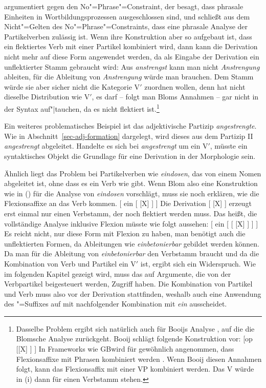 \citet[]{Blom2005a} argumentiert gegen den No"=Phrase"=Constraint, der besagt,
dass phrasale Einheiten in Wortbildungsprozessen ausgeschlossen sind, und schließt aus
dem Nicht"=Gelten des No"=Phrase"=Constraints, dass eine
phrasale Analyse der Partikelverben zulässig ist. Wenn ihre Konstruktion aber so aufgebaut
ist, dass ein flektiertes Verb mit einer Partikel kombiniert wird, dann kann die Derivation
nicht mehr auf diese Form angewendet werden, da als Eingabe der Derivation ein unflektierter
Stamm gebraucht wird: Aus \emph{anstrengst} kann man nicht \emph{Anstrengung} ableiten,
für die Ableitung von \emph{Anstrengung} würde man  brauchen.
Dem Stamm  würde sie aber sicher nicht die Kategorie V$'$ zuordnen wollen,
denn  hat nicht dieselbe Distribution wie V$'$, es darf -- folgt man
Bloms Annahmen -- gar nicht in der Syntax auf"|tauchen, da es nicht flektiert ist.\footnote{
  Dasselbe Problem ergibt sich natürlich auch für Booijs Analyse \citeyearpar[]{Booij2002a},
  auf die die Blomsche Analyse zurückgeht. Booij schlägt folgende Konstruktion vor:
\ea
{}[op [[X] ] ]
\z
In Frameworks wie GB\indexgb wird für gewöhnlich angenommen, dass Flexionsaffixe mit Phrasen
kombiniert werden \parencites[--259]{FF87a}[57]{Chomsky91a-u}. Wenn Booij diesen Annahmen folgt, kann das Flexionsaffix mit einer VP kombiniert
werden. Das V würde in (i) dann für einen Verbstamm stehen.%
} 
\largerpage

Ein weiteres problematisches Beispiel ist das adjektivische Partizip \emph{angestrengte}. Wie in
Abschnitt~\ref{sec-adj-formation} dargelegt, wird dieses aus dem Partizip II \emph{angestrengt} abgeleitet. Handelte es
sich bei \emph{angestrengt} um ein V$'$, müsste ein syntaktisches Objekt die Grundlage für eine
Derivation in der Morphologie sein.

Ähnlich liegt das Problem bei Partikelverben wie \emph{eindosen}, das von einem Nomen abgeleitet
ist, ohne dass es ein Verb wie  gibt. Wenn
Blom also eine Konstruktion wie in () für die Analyse von \emph{eindosen}
vorschlägt, muss sie noch erklären, wie die Flexionsaffixe an das Verb kommen.
\ea
{}[ ein   [ [X] ] ]
\z
Die Derivation [ [X] ] erzeugt erst einmal nur einen Verbstamm, der noch
flektiert werden muss. Das heißt, die vollständige Analyse inklusive Flexion müsste
wie folgt aussehen:
\ea
{}[ ein   [ [ [X] ] ] ]
\z
Es reicht nicht, nur diese Form mit Flexion zu haben, man benötigt auch
die unflektierten Formen, da Ableitungen wie \emph{einbetonierbar} gebildet
werden können. 
Da man für die Ableitung von \emph{einbetonierbar} den Verbstamm  braucht und da
die Kombination von Verb und Partikel ein V$'$ ist, ergibt sich ein Widerspruch. Wie im folgenden
Kapitel gezeigt wird, muss das \bars auf Argumente, die von der Verbpartikel beigesteuert werden,
Zugriff haben. Die Kombination von Partikel und Verb muss also vor der Derivation stattfinden,
weshalb auch eine Anwendung des \bars"=Suffixes auf  mit nachfolgender Kombination mit
\emph{ein} ausscheidet.

